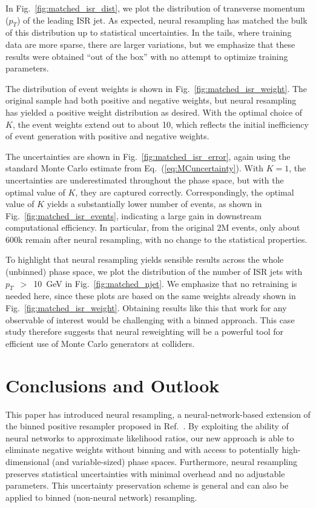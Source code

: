 \documentclass[prd,twocolumn,superscriptaddress,longbibliography,preprintnumbers,floatfix,nofootinbib]{revtex4-1}
\DeclareRobustCommand{\Fig}[1]{Fig.~\ref{fig:#1}}
\DeclareRobustCommand{\Eq}[1]{Eq.~(\ref{eq:#1})}
\DeclareRobustCommand{\Ref}[1]{Ref.~\cite{#1}}
\begin{document}
In \Fig{matched_isr_dist}, we plot the distribution of transverse momentum ($p_T$) of the leading ISR jet.
%
As expected, neural resampling has matched the bulk of this distribution up to statistical uncertainties.
%
In the tails, where training data are more sparse, there are larger variations, but we emphasize that these results were obtained ``out of the box'' with no attempt to optimize training parameters.


The distribution of event weights is shown in \Fig{matched_isr_weight}.
%
The original sample had both positive and negative weights, but neural resampling has yielded a positive weight distribution as desired.
%
With the optimal choice of $K$, the event weights extend out to about 10, which reflects the initial inefficiency of event generation with positive and negative weights.




The uncertainties are shown in \Fig{matched_isr_error}, again using the standard Monte Carlo estimate from \Eq{MCuncertainty}.
%
With $K = 1$, the uncertainties are underestimated throughout the phase space, but with the optimal value of $K$, they are captured correctly.
%
Correspondingly, the optimal value of $K$ yields a substantially lower number of events, as shown in \Fig{matched_isr_events}, indicating a large gain in downstream computational efficiency.
%
In particular, from the original 2M events, only about 600k remain after neural resampling, with no change to the statistical properties.


To highlight that neural resampling yields sensible results across the whole (unbinned) phase space, we plot the distribution of the number of ISR jets with $p_T$~$>$~10~GeV in \Fig{matched_njet}.
%
We emphasize that no retraining is needed here, since these plots are based on the same weights already shown in \Fig{matched_isr_weight}.
%
Obtaining results like this that work for any observable of interest would be challenging with a binned approach.
%
This case study therefore suggests that neural reweighting will be a powerful tool for efficient use of Monte Carlo generators at colliders.


\section{Conclusions and Outlook}
\label{sec:conclusions}

This paper has introduced neural resampling, a neural-network-based extension of the binned positive resampler proposed in \Ref{andersen2020positive}.
%
By exploiting the ability of neural networks to approximate likelihood ratios, our new approach is able to eliminate negative weights without binning and with access to potentially high-dimensional (and variable-sized) phase spaces.
%
Furthermore, neural resampling preserves statistical uncertainties with minimal overhead and no adjustable parameters.
%
This uncertainty preservation scheme is general and can also be applied to binned (non-neural network) resampling.
\end{document}
